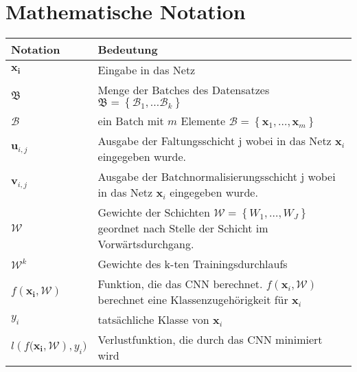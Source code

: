 
\chapter*{Mathematische Notation} \label{Notation}

\newcommand{\tabdummy}{\midrule[0pt]}

\begin{tabular}{p{}p{}}
  \textbf{Notation} & \textbf{Bedeutung} \\ \toprule[1pt]
   $\mathbf{x_{i}}$ & Eingabe in das Netz \\ \tabdummy
   $\mathfrak{B}$ & Menge der Batches des Datensatzes $\mathfrak{B}=\left\{ \mathcal{B}_{1} , \ldots \mathcal{B}_{k}   \right\} $\\ \tabdummy
   $\mathcal{B}$ & ein Batch mit $m$ Elemente $\mathcal{B}=\left\{ \mathbf{x}_1, \ldots, \mathbf{x}_m \right\} $\\ \tabdummy
   $\mathbf{u}_{i,j}$ & Ausgabe der Faltungsschicht j wobei in das Netz $\mathbf{x}_i$ eingegeben wurde.\\ \tabdummy
   $\mathbf{v}_{i,j}$ & Ausgabe der Batchnormalisierungsschicht j wobei in das Netz $\mathbf{x}_i$ eingegeben wurde.\\ \tabdummy
   $\mathcal{W}$ & Gewichte der Schichten $\mathcal{W}= \left\{ W_1, \ldots, W_J \right\} $ geordnet nach Stelle der Schicht im Vorwärtsdurchgang. \\ \tabdummy
   $\mathcal{W}^k$ & Gewichte des k-ten Trainingsdurchlaufs  \\ \tabdummy
   $f\left( \mathbf{x_i}, \mathcal{W}\right) $ & Funktion, die das CNN berechnet. $f\left( \mathbf{x}_i, \mathcal{W}\right)$ berechnet eine Klassenzugehörigkeit für $\mathbf{x}_i$ \\ \tabdummy
   $y_i$ & tatsächliche Klasse von $\mathbf{x}_i$ \\ \tabdummy     
   $l\left(f( \mathbf{x_i}, \mathcal{W}\right), y_i) $ & Verlustfunktion, die durch das CNN minimiert wird
\end{tabular}
